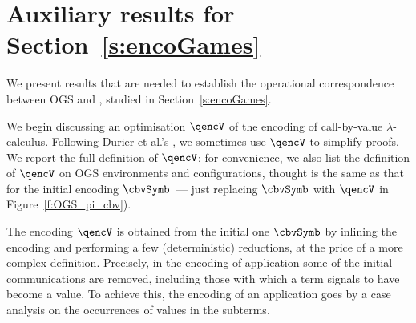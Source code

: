 \section{Auxiliary results for Section~\ref{s:encoGames}}
\label{a:oc}


We present results that are needed to establish the operational correspondence between 
OGS and \piI, studied in Section~\ref{s:encoGames}. 


We begin discussing an optimisation
$\qencV$ of
the  encoding of 
 call-by-value $\lambda$-calculus.
Following 
 Durier et al.'s 
\cite{DurierHS18}, 
we sometimes use $\qencV$  to simplify proofs. 
We report the 
full definition of   $\qencV$;
for  convenience, we also list the 
 definition of $\qencV$  on 
 OGS environments and configurations, thought  is the same as 
that for the initial encoding $\cbvSymb$~--- just replacing $\cbvSymb$ with 
 $\qencV$ in Figure~\ref{f:OGS_pi_cbv}). 


The encoding 
 $\qencV$
 is 
obtained  from the  initial one 
$\cbvSymb$ 
by inlining the encoding and performing a few (deterministic) reductions,
at the price of 
 a more complex definition.  Precisely, in the encoding of application 
 some of the initial
communications are removed, including those with which a term signals to have become a value. 
To achieve this,  the encoding of an 
application  goes by a case analysis
on the occurrences of values in the subterms.


